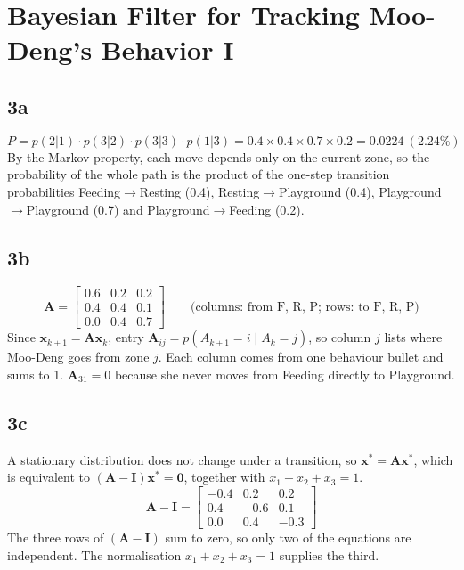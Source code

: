 \documentclass[11pt]{article}
\newcommand{\vect}[1]{\mathbf{#1}}
\newcommand{\mat}[1]{\mathbf{#1}}
\begin{document}
\clearpage
\section{Bayesian Filter for Tracking Moo-Deng's Behavior I}

\subsection*{3a}

\begin{equation*}
    P = p(2|1) \cdot p(3|2) \cdot p(3|3) \cdot p(1|3) = 0.4 \times 0.4 \times 0.7 \times 0.2 = 0.0224 \ (2.24\%)
\end{equation*}
By the Markov property, each move depends only on the current zone, so the probability of the whole path is the product of the one-step transition probabilities Feeding$\to$Resting (0.4), Resting$\to$Playground (0.4), Playground$\to$Playground (0.7) and Playground$\to$Feeding (0.2).

\subsection*{3b}

\begin{equation*}
    \mat{A} = \begin{bmatrix} 0.6 & 0.2 & 0.2 \\ 0.4 & 0.4 & 0.1 \\ 0.0 & 0.4 & 0.7 \end{bmatrix}
    \qquad \text{(columns: from F, R, P; rows: to F, R, P)}
\end{equation*}
Since $\vect{x}_{k+1} = \mat{A}\vect{x}_k$, entry $\mat{A}_{ij} = p(A_{k+1} = i \mid A_k = j)$, so column $j$ lists where Moo-Deng goes from zone $j$. Each column comes from one behaviour bullet and sums to 1. $\mat{A}_{31} = 0$ because she never moves from Feeding directly to Playground.

\subsection*{3c}

A stationary distribution does not change under a transition, so $\vect{x}^* = \mat{A}\vect{x}^*$, which is equivalent to $(\mat{A} - \mat{I})\vect{x}^* = \vect{0}$, together with $x_1 + x_2 + x_3 = 1$.
\begin{equation*}
    \mat{A} - \mat{I} = \begin{bmatrix} -0.4 & 0.2 & 0.2 \\ 0.4 & -0.6 & 0.1 \\ 0.0 & 0.4 & -0.3 \end{bmatrix}
\end{equation*}
The three rows of $(\mat{A} - \mat{I})$ sum to zero, so only two of the equations are independent. The normalisation $x_1 + x_2 + x_3 = 1$ supplies the third.
\end{document}
